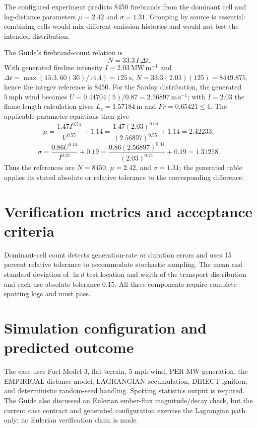 The configured experiment predicts 8450 firebrands from the dominant cell and log-distance parameters \(\mu=2.42\) and \(\sigma=1.31\). Grouping by source is essential: combining cells would mix different emission histories and would not test the intended distribution.

The Guide's firebrand-count relation is
\[
 N=33.3\,I\,\Delta t.
\]
With generated fireline intensity \(I=2.03~\mathrm{MW\,m^{-1}}\) and
\(\Delta t=\max(15.3,60(30)/14.4)=125~\mathrm{s}\),
\(N=33.3(2.03)(125)=8449.875\), hence the integer reference is 8450.
For the Sardoy distribution, the generated \(5~\mathrm{mph}\) wind becomes
\(U=0.44704(5)/0.87=2.56897~\mathrm{m\,s^{-1}}\); with \(I=2.03\) the
flame-length calculation gives \(L_c=1.57184~\mathrm{m}\) and
\(Fr=0.65421\leq1\).  The applicable parameter equations then give
\[
 \mu=\frac{1.47I^{0.54}}{U^{0.55}}+1.14
     =\frac{1.47(2.03)^{0.54}}{(2.56897)^{0.55}}+1.14=2.42233,
\]
\[
 \sigma=\frac{0.86U^{0.44}}{I^{0.21}}+0.19
 =\frac{0.86(2.56897)^{0.44}}{(2.03)^{0.21}}+0.19=1.31258.
\]
Thus the references are \(N=8450\), \(\mu=2.42\), and \(\sigma=1.31\);
the generated table applies its stated absolute or relative tolerance to
the corresponding difference.

\section{Verification metrics and acceptance criteria}

Dominant-cell count detects generation-rate or duration errors and uses 15 percent relative tolerance to accommodate stochastic sampling. The mean and standard deviation of \(\ln d\) test location and width of the transport distribution and each use absolute tolerance 0.15. All three components require complete spotting logs and must pass.

\section{Simulation configuration and predicted outcome}

The case uses Fuel Model 3, flat terrain, 5 mph wind, PER-MW generation, the EMPIRICAL distance model, LAGRANGIAN accumulation, DIRECT ignition, and deterministic random-seed handling. Spotting statistics output is required. The Guide also discussed an Eulerian ember-flux magnitude/decay check, but the current case contract and generated configuration exercise the Lagrangian path only; no Eulerian verification claim is made.

